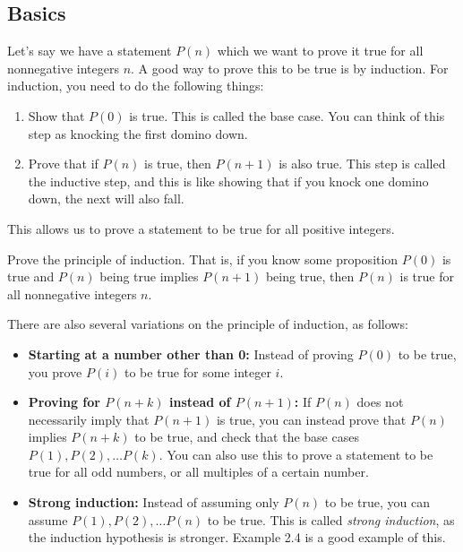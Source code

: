 \documentclass[mast]{lucky}
\newcommand{\skipline}{\vspace{2mm}}
\begin{document}
\subsection{Basics}
Let's say we have a statement $P(n)$ which we want to prove it true for all nonnegative integers $n$. A good way to prove this to be true is by induction. For induction, you need to do the following things:
\begin{enumerate}
    \item Show that $P(0)$ is true. This is called the base case. You can think of this step as knocking the first domino down.
    \item Prove that if $P(n)$ is true, then $P(n+1)$ is also true. This step is called the inductive step, and this is like showing that if you knock one domino down, the next will also fall.
\end{enumerate}
This allows us to prove a statement to be true for all positive integers.
\begin{exam}
Prove the principle of induction. That is, if you know some proposition $P(0)$ is true and $P(n)$ being true implies $P(n+1)$ being true, then $P(n)$ is true for all nonnegative integers $n$.
\end{exam}
\skipline
\noindent
There are also several variations on the principle of induction, as follows:
\begin{itemize}
    \item \textbf{Starting at a number other than 0:} Instead of proving $P(0)$ to be true, you prove $P(i)$ to be true for some integer $i$.
    \item \textbf{Proving for $P(n+k)$ instead of $P(n+1)$:} If $P(n)$ does not necessarily imply that $P(n+1)$ is true, you can instead prove that $P(n)$ implies $P(n+k)$ to be true, and check that the base cases $P(1), P(2), \dots P(k)$. You can also use this to prove a statement to be true for all odd numbers, or all multiples of a certain number.
    \item \textbf{Strong induction:} Instead of assuming only $P(n)$ to be true, you can assume $P(1), P(2), \dots P(n)$ to be true. This is called \textit{strong induction}, as the induction hypothesis is stronger. Example 2.4 is a good example of this.
\end{itemize}
\end{document}
